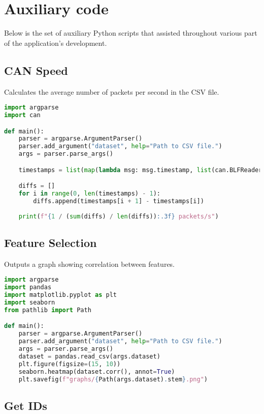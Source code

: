 \chapter{Auxiliary code}
\label{apdx:sec:tools}

Below is the set of auxiliary Python scripts that assisted throughout various part of the application's development.

\section{CAN Speed}

Calculates the average number of packets per second in the CSV file.

\begin{lstlisting}[language=Python]
import argparse
import can

def main():
    parser = argparse.ArgumentParser()
    parser.add_argument("dataset", help="Path to CSV file.")
    args = parser.parse_args()

    timestamps = list(map(lambda msg: msg.timestamp, list(can.BLFReader(args.dataset))))

    diffs = []
    for i in range(0, len(timestamps) - 1):
        diffs.append(timestamps[i + 1] - timestamps[i])
    
    print(f"{1 / (sum(diffs) / len(diffs)):.3f} packets/s")
\end{lstlisting}

\section{Feature Selection}

Outputs a graph showing correlation between features.

\begin{lstlisting}[language=Python]
import argparse
import pandas
import matplotlib.pyplot as plt
import seaborn
from pathlib import Path

def main():
    parser = argparse.ArgumentParser()
    parser.add_argument("dataset", help="Path to CSV file.")
    args = parser.parse_args()
    dataset = pandas.read_csv(args.dataset)
    plt.figure(figsize=(15, 10))
    seaborn.heatmap(dataset.corr(), annot=True)
    plt.savefig(f"graphs/{Path(args.dataset).stem}.png")
\end{lstlisting}

\section{Get IDs}

